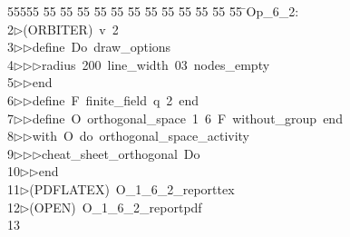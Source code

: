 %
%
\begin{tabbing}
55555 \= 55 \= 55 \= 55 \= 55 \= 55 \= 55 \= 55 \= 55 \= 55 \= 55 \= 55 \= 55 \= \>Op\_6\_2:\\[0pt]
2\>$\triangleright$\>(ORBITER)\ v\ 2\ \\[0pt]
3\>$\triangleright$\>$\triangleright$\>define\ Do\ draw\_options\ \\[0pt]
4\>$\triangleright$\>$\triangleright$\>$\triangleright$\>radius\ 200\ line\_width\ 03\ nodes\_empty\ \\[0pt]
5\>$\triangleright$\>$\triangleright$\>end\ \\[0pt]
6\>$\triangleright$\>$\triangleright$\>define\ F\ finite\_field\ q\ 2\ end\ \\[0pt]
7\>$\triangleright$\>$\triangleright$\>define\ O\ orthogonal\_space\ 1\ 6\ F\ without\_group\ end\ \\[0pt]
8\>$\triangleright$\>$\triangleright$\>with\ O\ do\ orthogonal\_space\_activity\ \\[0pt]
9\>$\triangleright$\>$\triangleright$\>$\triangleright$\>cheat\_sheet\_orthogonal\ Do\ \\[0pt]
10\>$\triangleright$\>$\triangleright$\>end\\[0pt]
11\>$\triangleright$\>(PDFLATEX)\ O\_1\_6\_2\_reporttex\ \\[0pt]
12\>$\triangleright$\>(OPEN)\ O\_1\_6\_2\_reportpdf\\[0pt]
13\>\end{tabbing}

